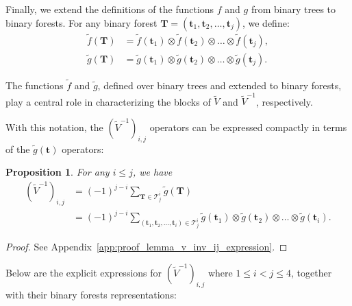\documentclass[superscriptaddress,onecolumn,nofootinbib,longbibliography,a4paper,accepted=2026-09-29]{quantumarticle}
\theoremstyle{plain}
\newtheorem{prop}[thm]{Proposition}
\theoremstyle{definition}
\numberwithin{thm}{section}
\numberwithin{assumption}{section}
\numberwithin{lemma}{section}
\numberwithin{prop}{section}
\numberwithin{cor}{section}
\numberwithin{definition}{section}
\numberwithin{rmk}{section}
\numberwithin{equation}{section}
\newcommand{\lrb}[1]{\left ( #1 \right )}
\newcommand{\mbt}{\mathbf{t}}
\newcommand{\mbf}{\mathbf{T}}
\begin{document}
Finally, we extend the definitions of the functions $f$ and $g$ from binary trees to binary forests. For any binary forest $\mbf = (\mbt_1, \mbt_2, \dots, \mbt_j)$, we define:
\begin{align}
    \tilde{f}(\mbf)&=\tilde{f}(\mbt_1)\otimes \tilde{f}(\mbt_2) \otimes \dots \otimes \tilde{f}(\mbt_j), \\
    \tilde{g}(\mbf)&=\tilde{g}(\mbt_1)\otimes \tilde{g}(\mbt_2) \otimes \dots \otimes \tilde{g}(\mbt_j).     
\end{align}

The functions $\tilde{f}$ and $\tilde{g}$, defined over binary trees and extended to binary forests, play a central role in characterizing the blocks of $\tilde{V}$ and $\tilde{V}^{-1}$, respectively.

With this notation, the $(\tilde{V}^{-1})_{i,j}$ operators can be expressed compactly in terms of the $\tilde{g}(\mbt)$ operators:
\begin{prop}
For any $i \le j$, we have
    \begin{align}
    (\tilde{V}^{-1})_{i,j} &= (-1)^{j-i} \sum_{\mbf \in \mathcal{T}^i_j} \tilde{g}(\mbf)\\
    &=(-1)^{j-i} \sum_{(\mbt_1,\mbt_2,\dots,\mbt_i) \in \mathcal{T}^i_j} \tilde{g}(\mbt_1) \otimes \tilde{g}(\mbt_2) \otimes \dots \otimes \tilde{g}(\mbt_i).    
    \label{eq:v_inv_ij_expression}
    \end{align}
    \label{prop:v_inv_ij_expression}
\end{prop}
\begin{proof}
See Appendix~\ref{app:proof_lemma_v_inv_ij_expression}.    
\end{proof}

Below are the explicit expressions for $\lrb{\tilde{V}^{-1}}_{i,j}$ where $1 \le i<j\le 4$, together with their binary forests representations:
\end{document}
